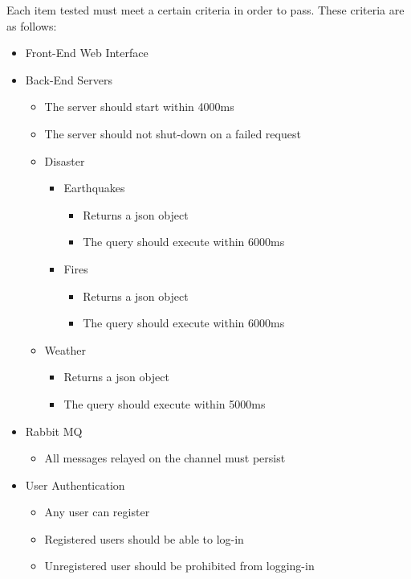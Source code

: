 Each item tested must meet a certain criteria in order to pass. These criteria are as follows:

\begin{itemize}

	\item Front-End Web Interface
			
	\item Back-End Servers
		\begin{itemize}
			\item The server should start within 4000ms
			\item The server should not shut-down on a failed request
		\end{itemize}
		\begin{itemize}
			\item Disaster
				\begin{itemize}
					\item Earthquakes 
						\begin{itemize}
							\item Returns a json object
							\item The query should execute within 6000ms
						\end{itemize}
					\item Fires
						\begin{itemize}
							\item Returns a json object
							\item The query should execute within 6000ms
						\end{itemize}
				\end{itemize}
			\item Weather
				\begin{itemize}
							\item Returns a json object
							\item The query should execute within 5000ms
						\end{itemize}
		\end{itemize}
		
	\item Rabbit MQ
		\begin{itemize}
			\item All messages relayed on the channel must persist
		\end{itemize}
	\item User Authentication
		\begin{itemize}
			\item Any user can register
			\item Registered users should be able to log-in
			\item Unregistered user should be prohibited from logging-in
		\end{itemize}
	
\end{itemize}